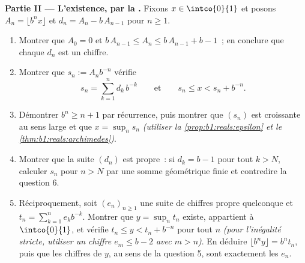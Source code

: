 \begin{problem}
\medskip
\noindent\textbf{Partie II --- L'existence, par la .} Fixons $x \in \intco{0}{1}$ et posons $A_n = \lfloor b^n
x \rfloor$ et $d_n = A_n - b\,A_{n-1}$ pour $n \geq 1$.
\begin{enumerate}[resume]
  \item Montrer que $A_0 = 0$ et $b\,A_{n-1} \leq A_n \leq
        b\,A_{n-1} + b - 1$~; en conclure que chaque $d_n$ est un
        chiffre.
  \item Montrer que $s_n := A_n b^{-n}$ vérifie
        \[
        s_n = \sum_{k=1}^{n} d_k\,b^{-k}
        \qquad\text{et}\qquad
        s_n \leq x < s_n + b^{-n} .
        \]
  \item Démontrer $b^n \geq n + 1$ par récurrence, puis montrer que
        $(s_n)$ est croissante au sens large et que $x = \sup_n s_n$
        \emph{(utiliser la \cref{prop:b1:reals:epsilon} et le
        \cref{thm:b1:reals:archimedes})}.
  \item Montrer que la suite $(d_n)$ est propre~: si $d_k = b - 1$
        pour tout $k > N$, calculer $s_n$ pour $n > N$ par une somme
        géométrique finie et contredire la question 6.
  \item Réciproquement, soit $(e_n)_{n \geq 1}$ une suite de chiffres
        propre quelconque et $t_n = \sum_{k=1}^n e_k b^{-k}$. Montrer
        que $y = \sup_n t_n$ existe, appartient à $\intco{0}{1}$, et
        vérifie $t_n \leq y < t_n + b^{-n}$ pour tout $n$
        \emph{(pour l'inégalité stricte, utiliser un chiffre $e_m \leq
        b - 2$ avec $m > n$)}. En déduire $\lfloor b^n y \rfloor = b^n
        t_n$, puis que les chiffres de $y$, au sens de la question 5,
        sont exactement les $e_n$.
\end{enumerate}


\end{problem}
